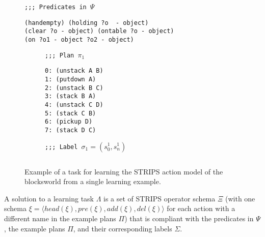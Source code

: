 \documentclass[letterpaper]{article} %
\newcommand{\tup}[1]{{\langle #1 \rangle}}
\begin{document}
\begin{figure}[hbt]
\begin{small}
{\tt ;;; Predicates in $\Psi$}
\begin{verbatim}
(handempty) (holding ?o  - object)
(clear ?o - object) (ontable ?o - object) 
(on ?o1 - object ?o2 - object)  
\end{verbatim}
\end{small}

\vspace{0.5cm}

\begin{subfigure}{.25\textwidth}
\begin{small}
{\tt ;;; Plan $\pi_1$}
\begin{verbatim}
0: (unstack A B)
1: (putdown A)
2: (unstack B C)
3: (stack B A)
4: (unstack C D)
5: (stack C B)
6: (pickup D)
7: (stack D C)
\end{verbatim}
\end{small}
\end{subfigure}%
\begin{subfigure}{.6\textwidth}
{\small\tt ;;; Label $\sigma_1=(s_0^1,s_{n}^1)$}
\begin{lstlisting}[mathescape]
\end{lstlisting}
\vspace{0.1cm}
\vspace{0.6cm}
\end{subfigure}%

 \caption{\small Example of a task for learning the STRIPS action model of the blocksworld from a single learning example.}
\label{fig:lexample}
\end{figure}

A solution to a learning task $\Lambda$ is a set of STRIPS operator schema $\Xi$ (with one schema $\xi=\tup{head(\xi),pre(\xi),add(\xi),del(\xi)}$ for each action with a different name in the example plans $\Pi$) that is compliant with the predicates in $\Psi$, the example plans $\Pi$, and their corresponding labels $\Sigma$. 
\end{document}
